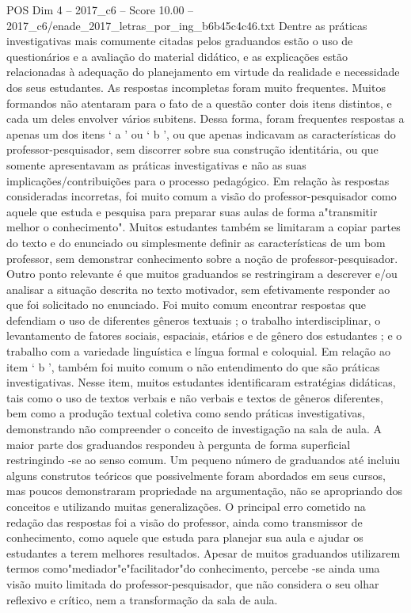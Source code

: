 \begin{textsample}{POS Dim 4 – 2017\_c6 – Score 10.00 – 2017\_c6/enade\_2017\_letras\_por\_ing\_b6b45c4c46.txt}
Dentre as práticas investigativas mais comumente citadas pelos graduandos estão o uso de questionários e a avaliação do material didático, e as explicações estão relacionadas à adequação do planejamento em virtude da realidade e necessidade dos seus estudantes.
As respostas incompletas foram muito frequentes.
Muitos formandos não atentaram para o fato de a questão conter dois itens distintos, e cada um deles envolver vários subitens.
Dessa forma, foram frequentes respostas a apenas um dos itens ‘ a ’ ou ‘ b ’, ou que apenas indicavam as características do professor-pesquisador, sem discorrer sobre sua construção identitária, ou que somente apresentavam as práticas investigativas e não as suas implicações/contribuições para o processo pedagógico.
Em relação às respostas consideradas incorretas, foi muito comum a visão do professor-pesquisador como aquele que estuda e pesquisa para preparar suas aulas de forma a"transmitir melhor o conhecimento".
Muitos estudantes também se limitaram a copiar partes do texto e do enunciado ou simplesmente definir as características de um bom professor, sem demonstrar conhecimento sobre a noção de professor-pesquisador.
Outro ponto relevante é que muitos graduandos se restringiram a descrever e/ou analisar a situação descrita no texto motivador, sem efetivamente responder ao que foi solicitado no enunciado.
Foi muito comum encontrar respostas que defendiam o uso de diferentes gêneros textuais ; o trabalho interdisciplinar, o levantamento de fatores sociais, espaciais, etários e de gênero dos estudantes ; e o trabalho com a variedade linguística e língua formal e coloquial.
Em relação ao item ‘ b ’, também foi muito comum o não entendimento do que são práticas investigativas.
Nesse item, muitos estudantes identificaram estratégias didáticas, tais como o uso de textos verbais e não verbais e textos de gêneros diferentes, bem como a produção textual coletiva como sendo práticas investigativas, demonstrando não compreender o conceito de investigação na sala de aula.
A maior parte dos graduandos respondeu à pergunta de forma superficial restringindo -se ao senso comum.
Um pequeno número de graduandos até incluiu alguns construtos teóricos que possivelmente foram abordados em seus cursos, mas poucos demonstraram propriedade na argumentação, não se apropriando dos conceitos e utilizando muitas generalizações.
O principal erro cometido na redação das respostas foi a visão do professor, ainda como transmissor de conhecimento, como aquele que estuda para planejar sua aula e ajudar os estudantes a terem melhores resultados.
Apesar de muitos graduandos utilizarem termos como"mediador"e"facilitador"do conhecimento, percebe -se ainda uma visão muito limitada do professor-pesquisador, que não considera o seu olhar reflexivo e crítico, nem a transformação da sala de aula.

\end{textsample}
